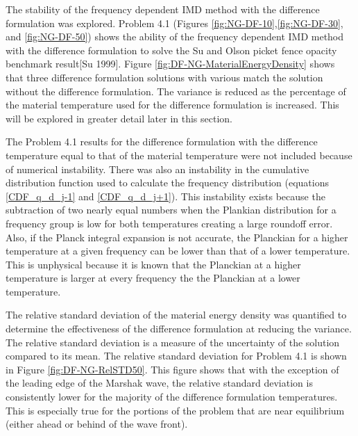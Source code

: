 	The stability of the frequency dependent IMD method with the difference formulation was explored. Problem 4.1 (Figures \ref{fig:NG-DF-10},\ref{fig:NG-DF-30}, and \ref{fig:NG-DF-50}) shows the ability of the frequency dependent IMD method with the difference formulation to solve the Su and Olson picket fence opacity benchmark result[Su 1999]. Figure \ref{fig:DF-NG-MaterialEnergyDensity} shows that three difference formulation solutions with various match the solution without the difference formulation. The variance is reduced as the percentage of the material temperature used for the difference formulation is increased. This will be explored in greater detail later in this section.

	The Problem 4.1 results for the difference formulation with the difference temperature equal to that of the material temperature were not included because of numerical instability. There was also an instability in the cumulative distribution function used to calculate the frequency distribution (equations \ref{CDF_q_d_j-1} and \ref{CDF_q_d_j+1}). This instability exists because the subtraction of two nearly equal numbers when the Plankian distribution for a frequency group is low for both temperatures creating a large roundoff error. Also, if the Planck integral expansion is not accurate, the Planckian for a higher temperature at a given frequency can be lower than that of a lower temperature. This is unphysical because it is known that the Planckian at a higher temperature is larger at every frequency the the Planckian at a lower temperature.

	The relative standard deviation of the material energy density was quantified to determine the effectiveness of the difference formulation at reducing the variance. The relative standard deviation is a measure of the uncertainty of the solution compared to its mean. The relative standard deviation for Problem 4.1 is shown in Figure \ref{fig:DF-NG-RelSTD50}. This figure shows that with the exception of the leading edge of the Marshak wave, the relative standard deviation is consistently lower for the majority of the difference formulation temperatures. This is especially true for the portions of the problem that are near equilibrium (either ahead or behind of the wave front).


